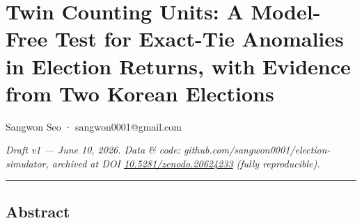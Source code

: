 \documentclass[
  11pt,
]{article}
\author{}
\date{}
\begin{document}
\section{Twin Counting Units: A Model-Free Test for Exact-Tie Anomalies
in Election Returns, with Evidence from Two Korean
Elections}\label{twin-counting-units-a-model-free-test-for-exact-tie-anomalies-in-election-returns-with-evidence-from-two-korean-elections}

Sangwon Seo · sangwon0001@gmail.com

\emph{Draft v1 --- June 10, 2026. Data \& code:
github.com/sangwon0001/election-simulator, archived at DOI
\href{https://doi.org/10.5281/zenodo.20624233}{10.5281/zenodo.20624233}
(fully reproducible).}

\begin{center}\rule{0.5\linewidth}{0.5pt}\end{center}

\subsection{Abstract}\label{abstract}
\end{document}

